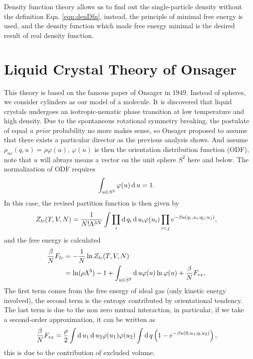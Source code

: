 Density function theory allows us to find out the single-particle density without the definition Eqn. \ref{eqn:denDfn}, instead, the principle of minimal free energy is used, and the density function which made free energy minimal is the desired result of real density function.

\section{Liquid Crystal Theory of Onsager}
This theory is based on the famous paper\cite{Onsager1949NYAS} of Onsager in 1949. Instead of spheres, we consider cylinders as our model of a molecule. It is discovered that liquid crystals undergoes an isotropic-nematic phase transition at low temperature and high density. Due to the spontaneous rotational symmetry breaking, the postulate of equal \textit{a prior} probability no more makes sense, so Onsager proposed to assume that there exists a particular director as the previous analysis shows. And assume $\rho_{ne}(q,u)=\rho\varphi(u)$, $\varphi(u)$ is then the orientation distribution function (ODF), note that $u$ will always means a vector on the unit sphere $S^2$ here and below. The normalization of ODF requires
\begin{equation}
	\int_{u\in S^2}\varphi(u)\operatorname{d}u =1.
\end{equation}
In this case, the revised partition function is then given by
\begin{equation}
	Z_{lc}(T,V,N) = \frac{1}{N!\Lambda^{3N}}\int\prod_i\operatorname{d}q_i\operatorname{d}u_i\varphi(u_i)\prod_{i<j}e^{-\beta u(q_i,u_i;q_j;u_j)},
\end{equation}
and the free energy is calculated
\begin{equation}
	\begin{split}
		\frac{\beta}{N} F_{lc}&= -\frac{1}{N}\ln Z_{lc}(T,V,N)\\
		&=\ln(\rho\Lambda^3) - 1 + \int_{u\in S^2}\operatorname{d}u \varphi(u)\ln\varphi(u) +\frac{\beta}{N}F_{ex},
	\end{split}
\end{equation}
The first term comes from the free energy of ideal gas (only kinetic energy involved), the second term is the entropy contributed by orientational tendency. The last term is due to the non zero mutual interaction, in particular, if we take a second-order approximation, it can be written as
\begin{equation}
	\frac{\beta}{N}F_{ex} = \frac{\rho}{2}\int \operatorname{d}u_1\operatorname{d}u_2\varphi(u_1)\varphi(u_2)\int\operatorname{d}q\left(1-e^{-\beta u(0,u_1;q,u_2)}\right),
\end{equation}
this is due to the contribution of excluded volume.

